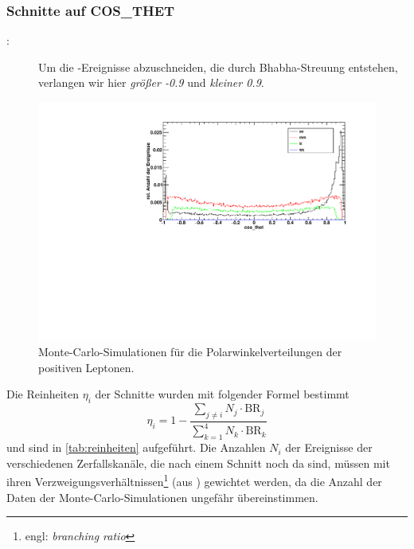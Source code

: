 \subsubsection*{Schnitte auf COS\_THET}
\begin{description}
\item[\Zee:] Um die \ee-Ereignisse abzuschneiden, die durch Bhabha-Streuung entstehen,
verlangen wir hier \emph{größer -0.9} und \emph{kleiner 0.9}.
\end{description}

\begin{figure}[H]
\begin{center}
  \includegraphics[width=\textwidth]{../img/dist_cos_thet.pdf}
 \caption{Monte-Carlo-Simulationen für die Polarwinkelverteilungen der positiven Leptonen.}
  \label{img:dist_cos_thet}
\end{center}
\end{figure} 

Die Reinheiten $\eta_i$ der Schnitte wurden mit folgender Formel bestimmt
\begin{equation}
  \eta_i = 1 - \frac{\sum_{j \neq i} N_j \cdot \text{BR}_j}{\sum_{k=1}^4 N_k \cdot \text{BR}_k}
\end{equation}
und sind in \autoref{tab:reinheiten} aufgeführt. Die Anzahlen $N_i$ der Ereignisse der verschiedenen Zerfallskanäle, 
die nach einem Schnitt noch da sind, müssen mit ihren Verzweigungsverhältnissen\footnote{engl: \emph{branching ratio}} 
(aus \cite{pdg}) gewichtet werden, da die Anzahl der Daten der Monte-Carlo-Simulationen ungefähr übereinstimmen.

